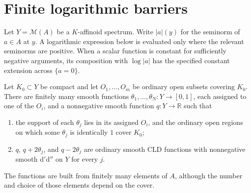 \documentclass[11pt,a4paper]{amsart}
\begin{document}
\section{Finite logarithmic barriers}
\label{sec:barriers}

Let $Y=\mathcal{M}(A)$ be a $K$-affinoid spectrum. Write $|a|(y)$ for the seminorm of $a\in A$ at $y$. A logarithmic expression below is evaluated only where the relevant seminorms are positive. When a scalar function is constant for sufficiently negative arguments, its composition with $\log|a|$ has the specified constant extension across $\{a=0\}$.

\begin{lemma}
\label{lem:affinoid-barriers}
Let $K_0\subset Y$ be compact and let $O_1,\ldots,O_m$ be ordinary open subsets covering $K_0$. There are finitely many smooth functions $\theta_1,\ldots,\theta_N:Y\to[0,1]$, each assigned to one of the $O_i$, and a nonnegative smooth function $q:Y\to\mathbb{R}$ such that
\begin{enumerate}
\item the support of each $\theta_j$ lies in its assigned $O_i$, and the ordinary open regions on which some $\theta_j$ is identically $1$ cover $K_0$;
\item $q$, $q+2\theta_j$, and $q-2\theta_j$ are ordinary smooth CLD functions with nonnegative smooth $\mathrm{d}'\mathrm{d}''$ on $Y$ for every $j$.
\end{enumerate}
The functions are built from finitely many elements of $A$, although the number and choice of those elements depend on the cover.
\end{lemma}
\end{document}
